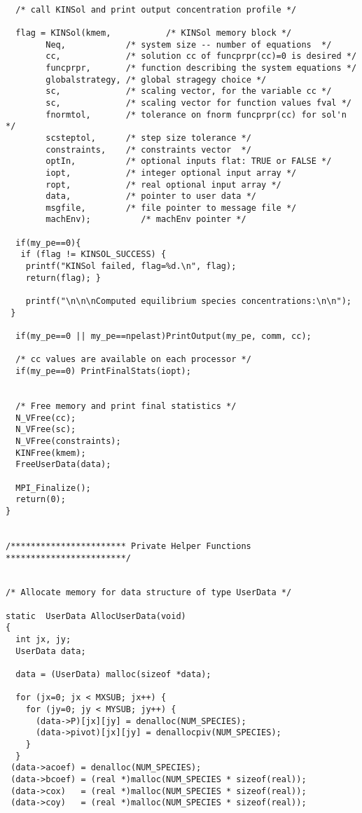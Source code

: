 \documentclass[11pt]{article}
\begin{document}
\begin{verbatim}
 
  /* call KINSol and print output concentration profile */

  flag = KINSol(kmem,           /* KINSol memory block */
        Neq,            /* system size -- number of equations  */
        cc,             /* solution cc of funcprpr(cc)=0 is desired */
        funcprpr,       /* function describing the system equations */
        globalstrategy, /* global stragegy choice */
        sc,             /* scaling vector, for the variable cc */
        sc,             /* scaling vector for function values fval */
        fnormtol,       /* tolerance on fnorm funcprpr(cc) for sol'n */
        scsteptol,      /* step size tolerance */
        constraints,    /* constraints vector  */
        optIn,          /* optional inputs flat: TRUE or FALSE */
        iopt,           /* integer optional input array */
        ropt,           /* real optional input array */
        data,           /* pointer to user data */
        msgfile,        /* file pointer to message file */
        machEnv);          /* machEnv pointer */

  if(my_pe==0){
   if (flag != KINSOL_SUCCESS) { 
    printf("KINSol failed, flag=%d.\n", flag); 
    return(flag); }

    printf("\n\n\nComputed equilibrium species concentrations:\n\n");
 }

  if(my_pe==0 || my_pe==npelast)PrintOutput(my_pe, comm, cc);

  /* cc values are available on each processor */
  if(my_pe==0) PrintFinalStats(iopt);
 

  /* Free memory and print final statistics */  
  N_VFree(cc);
  N_VFree(sc);
  N_VFree(constraints);
  KINFree(kmem);
  FreeUserData(data);

  MPI_Finalize();
  return(0);
}


/*********************** Private Helper Functions ************************/


/* Allocate memory for data structure of type UserData */

static  UserData AllocUserData(void)
{
  int jx, jy;
  UserData data;

  data = (UserData) malloc(sizeof *data);

  for (jx=0; jx < MXSUB; jx++) {
    for (jy=0; jy < MYSUB; jy++) {
      (data->P)[jx][jy] = denalloc(NUM_SPECIES);
      (data->pivot)[jx][jy] = denallocpiv(NUM_SPECIES);
    }
  }
 (data->acoef) = denalloc(NUM_SPECIES);
 (data->bcoef) = (real *)malloc(NUM_SPECIES * sizeof(real));
 (data->cox)   = (real *)malloc(NUM_SPECIES * sizeof(real));
 (data->coy)   = (real *)malloc(NUM_SPECIES * sizeof(real));
 


\end{verbatim}
\end{document}
